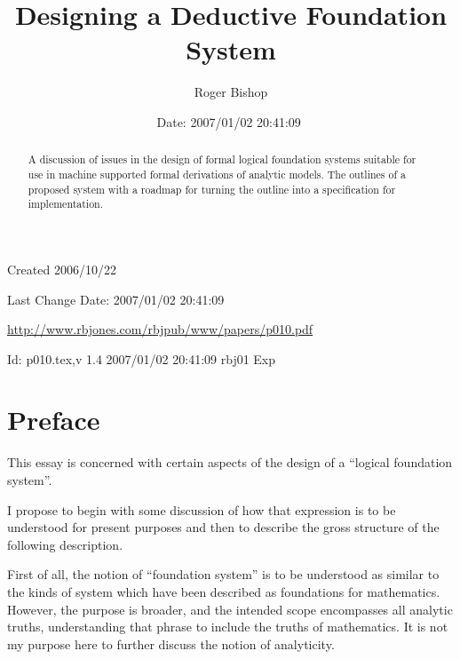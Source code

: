 \documentclass[numreferences]{rbjk}
\begin{document}
                                                                                   
\begin{article}
\begin{opening}  
\title{Designing a Deductive Foundation System}
\author{Roger Bishop }
\date{$ $Date: 2007/01/02 20:41:09 $ $}

\begin{abstract}
A discussion of issues in the design of formal logical foundation systems suitable for use in machine supported formal derivations of analytic models.
The outlines of a proposed system with a roadmap for turning the outline into a specification for implementation. 
\end{abstract}
\end{opening}

\vfill

\begin{centering}
\footnotesize{
Created 2006/10/22

Last Change $ $Date: 2007/01/02 20:41:09 $ $

\href{http://www.rbjones.com/rbjpub/www/papers/p010.pdf}{http://www.rbjones.com/rbjpub/www/papers/p010.pdf}

$ $Id: p010.tex,v 1.4 2007/01/02 20:41:09 rbj01 Exp $ $\\

}%
\end{centering}

\newpage
\setcounter{tocdepth}{4}
{\parskip-0pt\tableofcontents}

\section{Preface}

This essay is concerned with certain aspects of the design of a ``logical foundation system''.

I propose to begin with some discussion of how that expression is to be understood for present purposes and then to describe the gross structure of the following description.

First of all, the notion of ``foundation system'' is to be understood as similar to the kinds of system which have been described as foundations for mathematics.
However, the purpose is broader, and the intended scope encompasses all analytic truths, understanding that phrase to include the truths of mathematics.
It is not my purpose here to further discuss the notion of analyticity.


\end{article}
\end{document}
